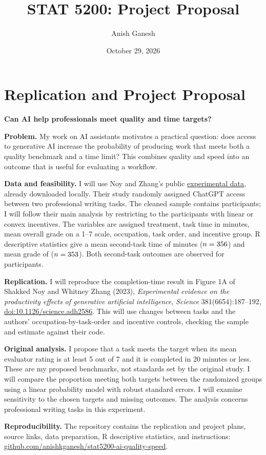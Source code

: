 \documentclass[11pt]{article}
\title{STAT 5200: Project Proposal}
\author{Anish Ganesh}
\date{October 29, 2026}
\begin{document}
\maketitle

\section*{Replication and Project Proposal}
\textbf{Can AI help professionals meet quality and time targets?}

\textbf{Problem.}
My work on AI assistants motivates a practical question: does access to
generative AI increase the probability of producing work that meets both
a quality benchmark and a time limit? This combines quality and speed
into an outcome that is useful for evaluating a workflow.

\textbf{Data and feasibility.}
I will use Noy and Zhang's public
\href{https://osf.io/xd7qw/}{experimental data}, already downloaded locally.
Their study randomly assigned ChatGPT access between two professional
writing tasks. The cleaned sample contains \HWTotalN{} participants; I will follow
their main analysis by restricting to the \HWMainN{} participants with linear or
convex incentives. The variables are assigned treatment, task time in
minutes, mean overall grade on a 1--7 scale, occupation, task order, and
incentive group. R descriptive statistics give a mean second-task time of
\HWMeanPostTime{} minutes (\(n=356\)) and mean grade of \HWMeanPostGrade{} (\(n=353\)).
Both second-task outcomes are observed for \HWPostCompleteN{} participants.

\textbf{Replication.}
I will reproduce the completion-time result in Figure 1A of
Shakked Noy and Whitney Zhang (2023), \emph{Experimental evidence on the
productivity effects of generative artificial intelligence},
\textit{Science} 381(6654):187--192,
\href{https://doi.org/10.1126/science.adh2586}{doi:10.1126/science.adh2586}.
This will use changes between tasks and the authors' occupation-by-task-order
and incentive controls, checking the sample and estimate against their code.

\textbf{Original analysis.}
I propose that a task meets the target when its mean evaluator rating is
at least 5 out of 7 and it is completed in 20 minutes or less.
These are my proposed benchmarks, not standards set by the original study.
I will compare the proportion meeting both targets between the randomized
groups using a linear probability model with robust standard errors.
I will examine sensitivity to the chosen targets and missing outcomes.
The analysis concerns professional writing tasks in this experiment.

\textbf{Reproducibility.}
The repository contains the replication and project plans, source
links, data preparation, R descriptive statistics, and instructions:
\href{https://github.com/anishkganesh/stat5200-ai-quality-speed}{github.com/anishkganesh/stat5200-ai-quality-speed}.
\end{document}
